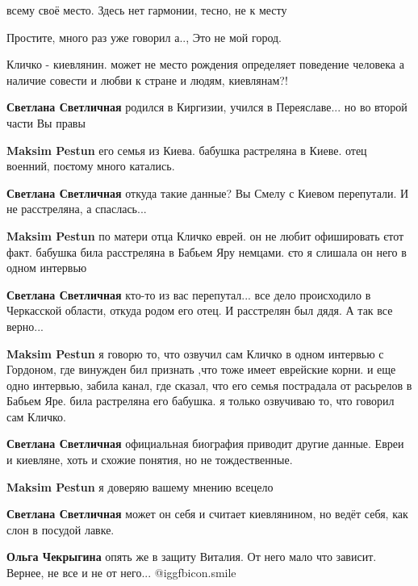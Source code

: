 \begin{itemize}
всему своё место. Здесь нет гармонии, тесно, не к месту

Простите, много раз уже говорил а.., Это не мой город.


Кличко - киевлянин. может не место рождения определяет поведение человека а
наличие совести и любви к стране и людям, киевлянам?!

\begin{itemize} %
\textbf{Светлана Светличная} родился в Киргизии, учился в Переяславе... но во второй части Вы правы

\begin{itemize} %
\textbf{Maksim Pestun} его семья из Киева. бабушка растреляна в Киеве. отец военний, поєтому много катались.

\textbf{Светлана Светличная} откуда такие данные? Вы Смелу с Киевом перепутали. И не расстреляна, а спаслась...

\textbf{Maksim Pestun} по матери отца Кличко еврей. он не любит офишировать єтот факт. бабушка била расстреляна в Бабьем Яру немцами. єто я слишала он него в одном интервью

\textbf{Светлана Светличная} кто-то из вас перепутал... все дело происходило в Черкасской области, откуда родом его отец. И расстрелян был дядя. А так все верно...

\textbf{Maksim Pestun} я говорю то, что озвучил сам Кличко в одном интервью с Гордоном, где винужден бил признать ,что тоже имеет еврейские корни. и еще одно интервью, забила канал, где сказал, что его семья пострадала от расьрелов в Бабьем Яре. била растреляна его бабушка. я только озвучиваю то, что говорил сам Кличко.

\textbf{Светлана Светличная} официальная биография приводит другие данные. Евреи и киевляне, хоть и схожие понятия, но не тождественные.

\textbf{Maksim Pestun} я доверяю вашему мнению всецело

\end{itemize} %

\textbf{Светлана Светличная} может он себя и считает киевлянином, но ведёт себя, как слон в посудой лавке.

\begin{itemize} %
\textbf{Ольга Чекрыгина} опять же в защиту Виталия. От него мало что зависит. Вернее, не все и не от него... @igg{fbicon.smile} 
\end{itemize} %


\end{itemize}
\end{itemize}
